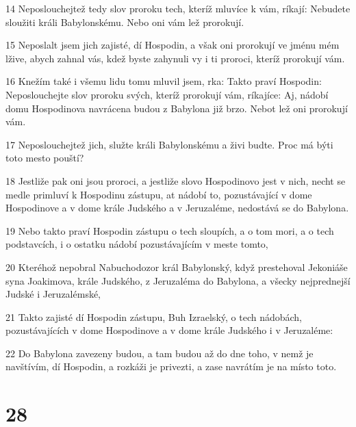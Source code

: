 \par 14 Neposlouchejtež tedy slov proroku tech, kteríž mluvíce k vám, ríkají: Nebudete sloužiti králi Babylonskému. Nebo oni vám lež prorokují.
\par 15 Neposlalt jsem jich zajisté, dí Hospodin, a však oni prorokují ve jménu mém lžive, abych zahnal vás, kdež byste zahynuli vy i ti proroci, kteríž prorokují vám.
\par 16 Knežím také i všemu lidu tomu mluvil jsem, rka: Takto praví Hospodin: Neposlouchejte slov proroku svých, kteríž prorokují vám, ríkajíce: Aj, nádobí domu Hospodinova navrácena budou z Babylona již brzo. Nebot lež oni prorokují vám.
\par 17 Neposlouchejtež jich, služte králi Babylonskému a živi budte. Proc má býti toto mesto pouští?
\par 18 Jestliže pak oni jsou proroci, a jestliže slovo Hospodinovo jest v nich, necht se medle primluví k Hospodinu zástupu, at nádobí to, pozustávající v dome Hospodinove a v dome krále Judského a v Jeruzaléme, nedostává se do Babylona.
\par 19 Nebo takto praví Hospodin zástupu o tech sloupích, a o tom mori, a o tech podstavcích, i o ostatku nádobí pozustávajícím v meste tomto,
\par 20 Kteréhož nepobral Nabuchodozor král Babylonský, když prestehoval Jekoniáše syna Joakimova, krále Judského, z Jeruzaléma do Babylona, a všecky nejprednejší Judské i Jeruzalémské,
\par 21 Takto zajisté dí Hospodin zástupu, Buh Izraelský, o tech nádobách, pozustávajících v dome Hospodinove a v dome krále Judského i v Jeruzaléme:
\par 22 Do Babylona zavezeny budou, a tam budou až do dne toho, v nemž je navštívím, dí Hospodin, a rozkáži je privezti, a zase navrátím je na místo toto.

\chapter{28}

